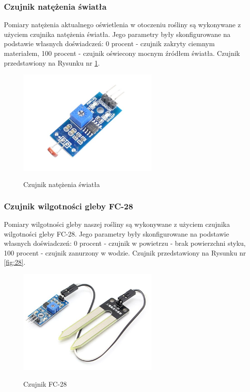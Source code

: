 \documentclass[12pt]{article}
\begin{document}
\newpage
\subsubsection{Czujnik natężenia światła}
Pomiary natężenia aktualnego oświetlenia w otoczeniu rośliny są wykonywane z użyciem czujnika natężenia światła. Jego parametry były skonfigurowane na podstawie własnych doświadczeń: 0 procent - czujnik zakryty ciemnym materiałem, 100 procent - czujnik oświecony mocnym źródłem światła. Czujnik przedstawiony na Rysunku nr \ref{fig:Czujnikswiatla}.
\begin{figure}[!h]
	\begin{center}
		{\includegraphics[width=7cm]{light_sensor_photo.png}}
	\end{center}
	\caption{Czujnik natężenia światła}
		\label{fig:Czujnikswiatla}
\end{figure}
\subsubsection{Czujnik wilgotności gleby FC-28}
Pomiary wilgotności gleby naszej rośliny są wykonywane z użyciem czujnika wilgotności gleby FC-28. Jego parametry były skonfigurowane na podstawie własnych doświadczeń: 0 procent - czujnik w powietrzu - brak powierzchni styku, 100 procent - czujnik zanurzony w wodzie. Czujnik przedstawiony na Rysunku nr \ref{fig:28}.

\begin{figure}[!h]
	\begin{center}
		{\includegraphics[width=7cm]{FC-28_photo.png}}
	\end{center}
	\caption{Czujnik FC-28}
	\label{fig:fc28}
\end{figure}
\end{document}
